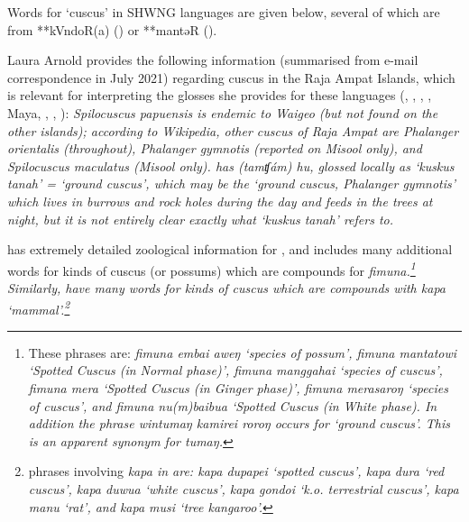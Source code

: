 \largerpage
{}
Words for `cuscus' in SHWNG languages are given below,
several of which are from **kVndoR(a) () or **mantəR ().

Laura Arnold provides the following information (summarised from
e-mail correspondence in July 2021) regarding cuscus in the Raja
Ampat Islands, which is relevant for interpreting the glosses she provides for
these languages (, , , , Ma{\Q}ya,
, , ): \it{Spilocuscus papuensis} is endemic
to Waigeo (but not found on the other islands); according to
Wikipedia, other cuscus of Raja Ampat are \it{Phalanger orientalis} (throughout),
\it{Phalanger gymnotis} (reported on Misool only),
and \it{Spilocuscus maculatus} (Misool only).
 has
\it{(tamʧám) hu}, glossed locally
as ‘kuskus tanah’ = ‘ground cuscus’,
which may be the ‘ground cuscus,
\it{Phalanger gymnotis}’ which lives in burrows
and rock holes during the day
and feeds in the trees at night,
but it is not entirely clear exactly what ‘kuskus tanah’ refers to.

\cite{Price2002} has extremely detailed zoological
information for , and includes many additional words for
kinds of cuscus (or possums) which are compounds for \it{fimuna}.\footnote{
		These  phrases are:
		\it{fimuna embai aweŋ} `species of possum',
		\it{fimuna mantatowi} `Spotted Cuscus (in Normal phase)',
		\it{fimuna manggahai} `species of cuscus',
		\it{fimuna mera} `Spotted Cuscus (in Ginger phase)',
		\it{fimuna merasaroŋ} `species of cuscus', and
		\it{fimuna nu(m)baibua} `Spotted Cuscus (in White phase).
		In addition the phrase \it{wintumaŋ kamirei roroŋ} occurs for `ground cuscus'.
		This is an apparent synonym for \it{tumaŋ}.}
Similarly, \cite{PriceDonohue2009} have many words for
kinds of cuscus which are compounds with \it{kapa} `mammal'.\footnote{
		 phrases involving \it{kapa} in \citet{PriceDonohue2009} are:
		\it{kapa dupapei} `spotted cuscus',
		\it{kapa dura} `red cuscus',
		\it{kapa duwua} `white cuscus',
		\it{kapa gondoi} `k.o. terrestrial cuscus',
		\it{kapa manu} `rat', and
		\it{kapa musi} `tree kangaroo'.}

